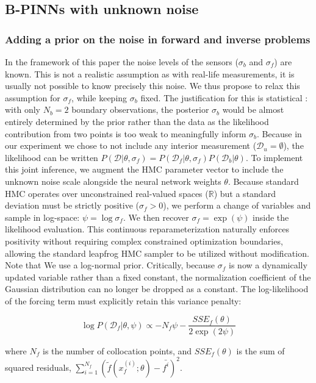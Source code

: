 \documentclass{article}
\begin{document}
\subsection{B-PINNs with unknown noise}
\subsubsection{Adding a prior on the noise in forward and inverse problems}
In the framework of this paper the noise levels of the sensors ($\sigma_b$ and $\sigma_f$) are known. This is not a realistic assumption as with real-life measurements, it is usually not possible to know precisely this noise. We thus propose to relax this assumption for $\sigma_f$, while keeping $\sigma_b$ fixed. 
The justification for this is statistical : with only $N_b = 2$ boundary observations, the posterior $\sigma_b$ would be almost entirely determined by the prior rather than the data as the likelihood contribution from two points is too weak to meaningfully inform $\sigma_b$. 
Because in our experiment we chose to not include any interior measurement ($\mathcal{D}_u = \emptyset$), the likelihood can be written $P(\mathcal{D}|\theta, \sigma_f) = P(\mathcal{D}_f|\theta, \sigma_f) P(\mathcal{D}_b|\theta)$. To implement this joint inference, we augment the HMC parameter vector to include the unknown noise scale alongside the neural network weights $\theta$. Because standard HMC operates over unconstrained real-valued spaces ($\mathbb{R}$) but a standard deviation must be strictly positive ($\sigma_f > 0$), we perform a change of variables and sample in log-space: $\psi = \log \sigma_f$. We then recover $\sigma_f = \exp(\psi)$ inside the likelihood evaluation. This continuous reparameterization naturally enforces positivity without requiring complex constrained optimization boundaries, allowing the standard leapfrog HMC sampler to be utilized without modification.  Note that We use a log-normal prior. 
Critically, because $\sigma_f$ is now a dynamically updated variable rather than a fixed constant, the normalization coefficient of the Gaussian distribution can no longer be dropped as a constant. The log-likelihood of the forcing term must explicitly retain this variance penalty:

$$\log P(\mathcal{D}_f | \theta, \psi) \propto -N_f \psi - \frac{SSE_f(\theta)}{2 \exp(2\psi)}$$

where $N_f$ is the number of collocation points, and $SSE_f(\theta)$ is the sum of squared  residuals, $\sum_{i=1}^{N_f} (\tilde{f}(x^{(i)}_f ; \theta) - \bar{f^{i}})^2$. 
\end{document}
